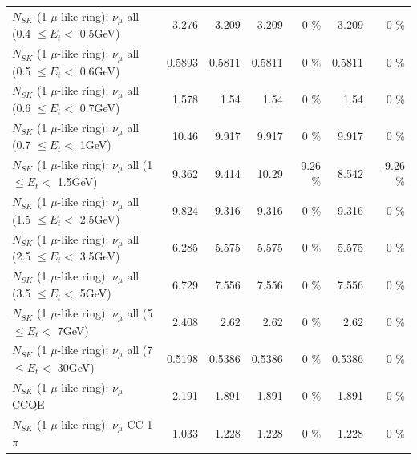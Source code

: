\begin{table}
\begin{tabular}{| l | r | r | r  r | r  r |}
       $N_{SK}$ (1 $\mu$-like ring): $\nu_{\mu}$ all (0.4 $\leq E_{t} <$ 0.5GeV) &           3.276 &           3.209 &           3.209 &        0 \%  &           3.209 &        0 \%  \\ 
       $N_{SK}$ (1 $\mu$-like ring): $\nu_{\mu}$ all (0.5 $\leq E_{t} <$ 0.6GeV) &          0.5893 &          0.5811 &          0.5811 &        0 \%  &          0.5811 &        0 \%  \\ 
       $N_{SK}$ (1 $\mu$-like ring): $\nu_{\mu}$ all (0.6 $\leq E_{t} <$ 0.7GeV) &           1.578 &            1.54 &            1.54 &        0 \%  &            1.54 &        0 \%  \\ 
         $N_{SK}$ (1 $\mu$-like ring): $\nu_{\mu}$ all (0.7 $\leq E_{t} <$ 1GeV) &           10.46 &           9.917 &           9.917 &        0 \%  &           9.917 &        0 \%  \\ 
         $N_{SK}$ (1 $\mu$-like ring): $\nu_{\mu}$ all (1 $\leq E_{t} <$ 1.5GeV) &           9.362 &           9.414 &           10.29 &     9.26 \%  &           8.542 &    -9.26 \%  \\ 
       $N_{SK}$ (1 $\mu$-like ring): $\nu_{\mu}$ all (1.5 $\leq E_{t} <$ 2.5GeV) &           9.824 &           9.316 &           9.316 &        0 \%  &           9.316 &        0 \%  \\ 
       $N_{SK}$ (1 $\mu$-like ring): $\nu_{\mu}$ all (2.5 $\leq E_{t} <$ 3.5GeV) &           6.285 &           5.575 &           5.575 &        0 \%  &           5.575 &        0 \%  \\ 
         $N_{SK}$ (1 $\mu$-like ring): $\nu_{\mu}$ all (3.5 $\leq E_{t} <$ 5GeV) &           6.729 &           7.556 &           7.556 &        0 \%  &           7.556 &        0 \%  \\ 
           $N_{SK}$ (1 $\mu$-like ring): $\nu_{\mu}$ all (5 $\leq E_{t} <$ 7GeV) &           2.408 &            2.62 &            2.62 &        0 \%  &            2.62 &        0 \%  \\ 
          $N_{SK}$ (1 $\mu$-like ring): $\nu_{\mu}$ all (7 $\leq E_{t} <$ 30GeV) &          0.5198 &          0.5386 &          0.5386 &        0 \%  &          0.5386 &        0 \%  \\ 
\hline
\hline
\hline
                              $N_{SK}$ (1 $\mu$-like ring): $\bar{\nu_\mu}$ CCQE &           2.191 &           1.891 &           1.891 &        0 \%  &           1.891 &        0 \%  \\ 
                         $N_{SK}$ (1 $\mu$-like ring): $\bar{\nu_\mu}$ CC 1$\pi$ &           1.033 &           1.228 &           1.228 &        0 \%  &           1.228 &        0 \%  \\ 

\end{tabular}
\end{table}
